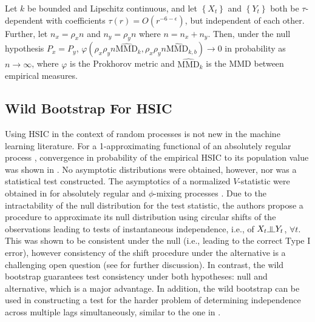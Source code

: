 \begin{proposition}\label{prop:mmd}
 Let $k$ be bounded and Lipschitz continuous, and let $\left\{ X_t \right\}$ and $\left\{ Y_t \right\}$ 
 both be $\tau$-dependent with coefficients $\tau(r) =  O(r^{-6-\epsilon})$, but independent of each other. Further, let $n_x=\rho_x n$ and $n_y=\rho_y n$ where $n=n_x+n_y$. Then, under the null hypothesis $P_x=P_y$, $\varphi\left(\rho_x \rho_y n\widehat{\text{MMD}}_k, \rho_x \rho_y n\widehat{\text{MMD}}_{k,b}\right)\to 0$ in probability as $n\to\infty$, where $\varphi$ is the Prokhorov metric and $\widehat{\text{MMD}}_k$ is the MMD between empirical measures.
\end{proposition}

\subsection{Wild Bootstrap For HSIC}\label{sec:hsic}
Using HSIC in the context of random processes is not new in the machine learning literature. For a 1-approximating functional of an absolutely regular process \cite{borovkova2001limit}, convergence in probability of the empirical HSIC to its population value was shown in \cite{smola_kernel_2008}. No asymptotic distributions were obtained, however, nor was a statistical test constructed.  The asymptotics of a normalized $V$-statistic were obtained in \cite{chwialkowski2014kernel}  for absolutely regular and $\phi$-mixing processes \cite{doukhan1994mixing}. Due to the intractability of the null distribution for the test statistic, the authors propose a procedure to approximate its null distribution using circular shifts of the observations leading to tests of instantaneous independence, i.e., of $X_t \indep Y_t$, $\forall t$. This was shown to be consistent under the null (i.e., leading to the correct Type I error), however consistency of the shift procedure under the alternative is a challenging open question (see \cite[Section A.2]{chwialkowski2014kernel} for further discussion).
 In contrast, the wild bootstrap guarantees test consistency under both hypotheses: null and alternative, which is a major advantage. 
In addition,  the wild bootstrap can be used in constructing a test for the harder problem of determining independence across multiple lags simultaneously, similar to the one in \cite{besserve_statistical_2013}.

